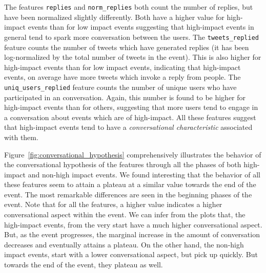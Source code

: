 The features \texttt{replies} and \texttt{norm\_replies} both count
the number of replies, but have been normalized slightly differently.
Both have a higher value for high-impact events than for low impact
events suggesting that high-impact events in general tend to spark
more conversation between the users. The \texttt{tweets\_replied}
feature counts the number of tweets which have generated replies (it
has been log-normalized by the total number of tweets in the event).
This is also higher for high-impact events than for low impact events,
indicating that high-impact events, on average have more tweets which
invoke a reply from people. The \texttt{uniq\_users\_replied} feature
counts the number of unique users who have participated in an
conversation. Again, this number is found to be higher for high-impact
events than for others, suggesting that more users tend to engage in a
conversation about events which are of high-impact. All these features
suggest that high-impact events tend to have a \emph{conversational
  characteristic} associated with them.


Figure~\ref{fig:conversational_hypothesis} comprehensively illustrates
the behavior of the conversational hypothesis of the features through
all the phases of both high-impact and non-high impact events. We
found interesting that the behavior of all these features seem to attain a
plateau at a similar value towards the end of the event. The most
remarkable differences are seen in the beginning phases of the event.
Note that for all the features, a higher value indicates a higher
conversational aspect within the event. We can infer from the plots
that, the high-impact events, from the very start have a much higher
conversational aspect. But, as the event progresses, the marginal
increase in the amount of conversation decreases and eventually
attains a plateau. On the other hand, the non-high impact events,
start with a lower conversational aspect, but pick up quickly. But
towards the end of the event, they plateau as well.

